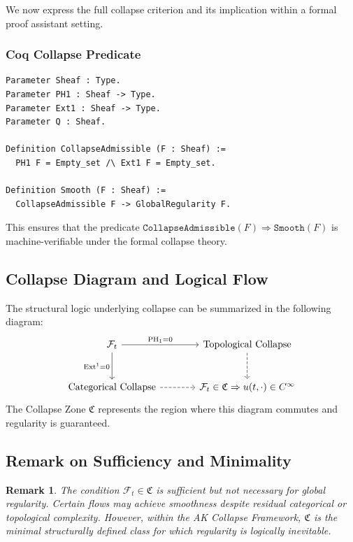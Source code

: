 \documentclass[11pt]{article}
\newtheorem{remark}[theorem]{Remark}
\begin{document}
We now express the full collapse criterion and its implication within a formal proof assistant setting.

\subsubsection*{Coq Collapse Predicate}
\begin{lstlisting}
Parameter Sheaf : Type.
Parameter PH1 : Sheaf -> Type.
Parameter Ext1 : Sheaf -> Type.
Parameter Q : Sheaf.

Definition CollapseAdmissible (F : Sheaf) :=
  PH1 F = Empty_set /\ Ext1 F = Empty_set.

Definition Smooth (F : Sheaf) :=
  CollapseAdmissible F -> GlobalRegularity F.
\end{lstlisting}

This ensures that the predicate \( \texttt{CollapseAdmissible}(F) \Rightarrow \texttt{Smooth}(F) \) is machine-verifiable under the formal collapse theory.

\subsection{Collapse Diagram and Logical Flow}

The structural logic underlying collapse can be summarized in the following diagram:
\[
\begin{tikzcd}[row sep=large, column sep=large]
\mathcal{F}_t \arrow[r, "\text{PH}_1 = 0"] \arrow[d, "\text{Ext}^1 = 0"']
& \text{Topological Collapse} \arrow[d, dashrightarrow] \\
\text{Categorical Collapse} \arrow[r, dashrightarrow]
& \mathcal{F}_t \in \mathfrak{C} \Rightarrow u(t, \cdot) \in C^\infty
\end{tikzcd}
\]
The Collapse Zone \( \mathfrak{C} \) represents the region where this diagram commutes and regularity is guaranteed.

\subsection{Remark on Sufficiency and Minimality}

\begin{remark}
The condition \( \mathcal{F}_t \in \mathfrak{C} \) is \emph{sufficient} but not \emph{necessary} for global regularity. Certain flows may achieve smoothness despite residual categorical or topological complexity. However, within the AK Collapse Framework, \( \mathfrak{C} \) is the minimal structurally defined class for which regularity is logically inevitable.
\end{remark}
\end{document}
